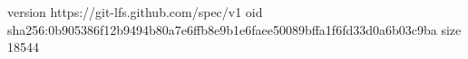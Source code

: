 version https://git-lfs.github.com/spec/v1
oid sha256:0b905386f12b9494b80a7e6ffb8e9b1e6faee50089bffa1f6fd33d0a6b03c9ba
size 18544
